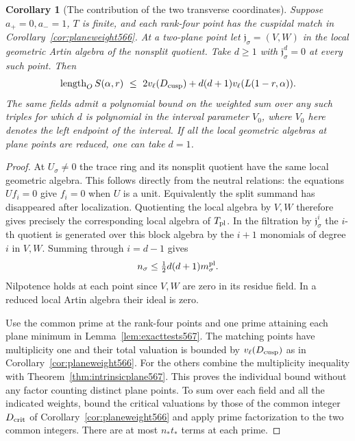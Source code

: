 \documentclass[a4paper,11pt]{article}
\newtheorem{corollary}[proposition]{Corollary}
\theoremstyle{definition}
\theoremstyle{remark}
\numberwithin{equation}{section}
\begin{document}
\begin{corollary}[The contribution of the two transverse coordinates]
\leavevmode\label{cor:transverseplane567}
Suppose \(a_+=0,a_-=1\), \(T\) is finite, and each rank-four
point has the cuspidal match in
Corollary~\ref{cor:planeweight566}. At a two-plane point let
\(\mathfrak j_\sigma=(V,W)\) in the local geometric Artin
algebra of the nonsplit quotient. Take \(d\ge1\) with
\(\mathfrak j_\sigma^d=0\) at every such point. Then
\[
 \operatorname{length}_O S(\alpha,r)
   \ \le\ 2v_\ell(D_{\rm cusp})+
                  d(d+1)v_\ell(L(1-r,\alpha)).
\]
The same fields admit a polynomial bound on the weighted sum
over any such triples for which \(d\) is polynomial in the
interval parameter \(V_{\!0}\), where \(V_{\!0}\) here denotes
the left endpoint of the interval. If all the local geometric
algebras at plane points are reduced, one can take \(d=1\).
\end{corollary}
\begin{proof}
At \(U_\sigma\ne0\) the trace ring and its nonsplit quotient
have the same local geometric algebra. This follows directly
from the neutral relations: the equations \(U f_i=0\) give
\(f_i=0\) when \(U\) is a unit. Equivalently the split summand
has disappeared after localization. Quotienting the local
algebra by \(V,W\) therefore gives precisely the corresponding
local algebra of \(T_{\rm pl}\). In the filtration by
\(\mathfrak j_\sigma^i\) the \(i\)-th quotient is generated
over this block algebra by the \(i+1\) monomials of degree
\(i\) in \(V,W\). Summing through \(i=d-1\) gives
\[
                   n_\sigma\le \tfrac12d(d+1)m_\sigma^{\rm pl}.
\]
Nilpotence holds at each point since \(V,W\) are zero in its
residue field. In a reduced local Artin algebra their ideal
is zero.

Use the common prime at the rank-four points and one prime
attaining each plane minimum in Lemma~\ref{lem:exacttests567}.
The matching points have multiplicity one and their total
valuation is bounded by \(v_\ell(D_{\rm cusp})\) as in
Corollary~\ref{cor:planeweight566}. For the others combine
the multiplicity inequality with
Theorem~\ref{thm:intrinsicplane567}. This proves the
individual bound without any factor counting distinct
plane points. To sum over each field and all the indicated
weights, bound the critical valuations by those of the
common integer \(D_{\rm crit}\) of
Corollary~\ref{cor:planeweight566} and apply prime
factorization to the two common integers. There are at most
\(n_*t_*\) terms at each prime.
\end{proof}
\end{document}
